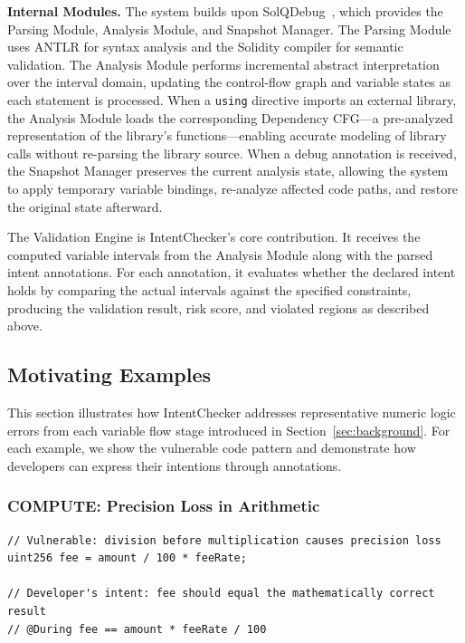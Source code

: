 \documentclass[pdflatex,sn-basic]{sn-jnl}%
\theoremstyle{thmstyleone}%
\theoremstyle{thmstyletwo}%
\theoremstyle{thmstylethree}%
\begin{document}
\smallskip
\noindent\textbf{Internal Modules.}
The system builds upon SolQDebug~\citep{solqdebug}, which provides the Parsing Module, Analysis Module, and Snapshot Manager.
The Parsing Module uses ANTLR for syntax analysis and the Solidity compiler for semantic validation.
The Analysis Module performs incremental abstract interpretation over the interval domain, updating the control-flow graph and variable states as each statement is processed.
When a \texttt{using} directive imports an external library, the Analysis Module loads the corresponding Dependency CFG---a pre-analyzed representation of the library's functions---enabling accurate modeling of library calls without re-parsing the library source.
When a debug annotation is received, the Snapshot Manager preserves the current analysis state, allowing the system to apply temporary variable bindings, re-analyze affected code paths, and restore the original state afterward.

The Validation Engine is IntentChecker's core contribution.
It receives the computed variable intervals from the Analysis Module along with the parsed intent annotations.
For each annotation, it evaluates whether the declared intent holds by comparing the actual intervals against the specified constraints, producing the validation result, risk score, and violated regions as described above.

\subsection{Motivating Examples}

This section illustrates how IntentChecker addresses representative numeric logic errors from each variable flow stage introduced in Section~\ref{sec:background}.
For each example, we show the vulnerable code pattern and demonstrate how developers can express their intentions through annotations.

\subsubsection{COMPUTE: Precision Loss in Arithmetic}


\begin{lstlisting}[caption={Example: Precision loss in fee calculation}, label={lst:compute-example}]
// Vulnerable: division before multiplication causes precision loss
uint256 fee = amount / 100 * feeRate;

// Developer's intent: fee should equal the mathematically correct result
// @During fee == amount * feeRate / 100
\end{lstlisting}
\end{document}
